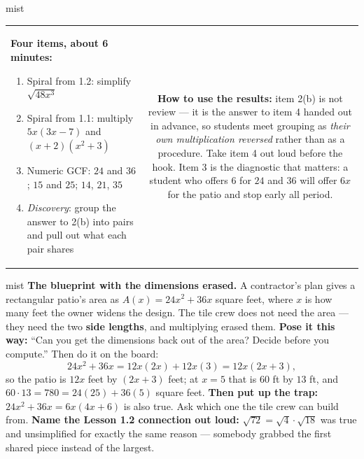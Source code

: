 \documentclass[10pt]{article}
\begin{document}
\begin{fixedskillbox}{mist}
\begin{tabularx}{\linewidth}{@{}X c@{}}
\begin{minipage}[t]{0.55\linewidth}\vspace{0pt}
\textbf{Four items, about 6 minutes:}
\begin{enumerate}[leftmargin=1.4em, itemsep=1pt, topsep=2pt]
  \item Spiral from 1.2: simplify $\sqrt{48x^3}$
  \item Spiral from 1.1: multiply $5x(3x-7)$ and $(x+2)\left(x^2+3\right)$
  \item Numeric GCF: $24$ and $36$; $15$ and $25$; $14$, $21$, $35$
  \item \emph{Discovery}: group the answer to 2(b) into pairs and pull out what each pair shares
\end{enumerate}
\end{minipage}
&
\begin{minipage}[t]{0.38\linewidth}\vspace{0pt}
\textbf{How to use the results:} item 2(b) is not review --- it is the answer to item 4 handed out
in advance, so students meet grouping as \emph{their own multiplication reversed} rather than as a
procedure. Take item 4 out loud before the hook. Item 3 is the diagnostic that matters: a student
who offers $6$ for $24$ and $36$ will offer $6x$ for the patio and stop early all period.
\end{minipage}
\end{tabularx}
\end{fixedskillbox}

\begin{skillbox}[Hook]{mist}
\textbf{The blueprint with the dimensions erased.} A contractor's plan gives a rectangular patio's
area as $A(x)=24x^2+36x$ square feet, where $x$ is how many feet the owner widens the design. The
tile crew does not need the area --- they need the two \textbf{side lengths}, and multiplying
erased them. \textbf{Pose it this way:} ``Can you get the dimensions back out of the area? Decide
before you compute.'' Then do it on the board:
\[ 24x^2+36x = 12x(2x) + 12x(3) = 12x(2x+3), \]
so the patio is $12x$ feet by $(2x+3)$ feet; at $x=5$ that is $60$ ft by $13$ ft, and
$60 \cdot 13 = 780 = 24(25)+36(5)$ square feet. \textbf{Then put up the trap:}
$24x^2+36x=6x(4x+6)$ is also true. Ask which one the tile crew can build from. \textbf{Name the
Lesson 1.2 connection out loud:} $\sqrt{72}=\sqrt4\cdot\sqrt{18}$ was true and unsimplified for
exactly the same reason --- somebody grabbed the first shared piece instead of the largest.
\end{skillbox}
\end{document}
